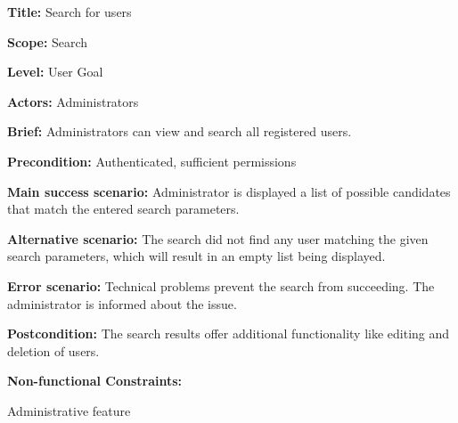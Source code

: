 
\begin{DoxyItemize}
\item {\bfseries Title\+:} Search for users
\item {\bfseries Scope\+:} Search
\item {\bfseries Level\+:} User Goal
\item {\bfseries Actors\+:} Administrators
\item {\bfseries Brief\+:} Administrators can view and search all registered users.
\end{DoxyItemize}


\begin{DoxyItemize}
\item {\bfseries Precondition\+:} Authenticated, sufficient permissions
\item {\bfseries Main success scenario\+:} Administrator is displayed a list of possible candidates that match the entered search parameters.
\item {\bfseries Alternative scenario\+:} The search did not find any user matching the given search parameters, which will result in an empty list being displayed.
\item {\bfseries Error scenario\+:} Technical problems prevent the search from succeeding. The administrator is informed about the issue.
\item {\bfseries Postcondition\+:} The search results offer additional functionality like editing and deletion of users.
\item {\bfseries Non-\/functional Constraints\+:}
\begin{DoxyItemize}
\item Administrative feature 
\end{DoxyItemize}
\end{DoxyItemize}